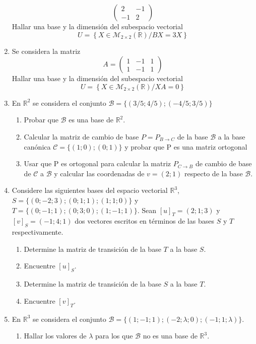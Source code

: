 \documentclass[12pt]{article}
\begin{document}
\begin{enumerate}
$$\begin{pmatrix}
    2 & -1\\
    -1 & 2    
  \end{pmatrix}
  $$
  Hallar una base y la dimensión del subespacio vectorial
  $$
  U = \left\{ X \in \mathcal{M}_{2\times2}(\mathbb{R}) / BX = 3X\right\}
  $$
  \item Se considera la matriz
  $$
  A=\begin{pmatrix}
    1 & -1 & 1\\
    1 & -1 & 1    
  \end{pmatrix}
  $$
  Hallar una base y la dimensión del subespacio vectorial
  $$
  U = \left\{ X \in \mathcal{M}_{2\times2}(\mathbb{R}) / XA = 0\right\}
  $$
  \item En $\mathbb{R}^2$ se considera el conjunto $\mathcal{B} = \{(3/5; 4/5); (-4/5; 3/5)\}$
  \begin{enumerate}
    \item Probar que $\mathcal{B}$ es una base de $\mathbb{R}^2$.
    \item Calcular la matriz de cambio de base $P = P_{B\to C}$ de la base $\mathcal{B}$ a la base canónica $\mathcal{C} =\{(1; 0); (0; 1)\}$ y probar que P es una matriz ortogonal
    \item Usar que P es ortogonal para calcular la matriz $P_{C\to B}$ de cambio de base de $\mathcal{C}$ a $\mathcal{B}$ y calcular las coordenadas de $v = (2; 1)$ respecto de la base $\mathcal{B}$.
  \end{enumerate}
  \item Considere las siguientes bases del espacio vectorial $\mathbb{R}^3$, $S = \{(0;-2; 3); (0; 1; 1); (1; 1; 0)\}$ y $T = \{(0;-1; 1); (0; 3; 0); (1;-1; 1)\}$. Sean $[u]_T = (2; 1; 3)$ y $[v]_S = (-1; 4; 1)$ dos vectores escritos en términos de las bases $S$ y $T$ respectivamente.
  \begin{enumerate}
    \item Determine la matriz de transición de la base $T$ a la base $S$.
    \item Encuentre $[u]_S$. 
    \item Determine la matriz de transición de la base $S$ a la base $T$.
    \item Encuentre $[v]_T$.
  \end{enumerate}
  \item En $\mathbb{R}^3$ se considera el conjunto $\mathcal{B} = \{(1;-1; 1); (-2; \lambda; 0); (-1; 1; \lambda)\}$.
  \begin{enumerate}
    \item Hallar los valores de $\lambda$ para los que $\mathcal{B}$ no es una base de $\mathbb{R}^3$.

\end{enumerate}
\end{enumerate}
\end{document}
